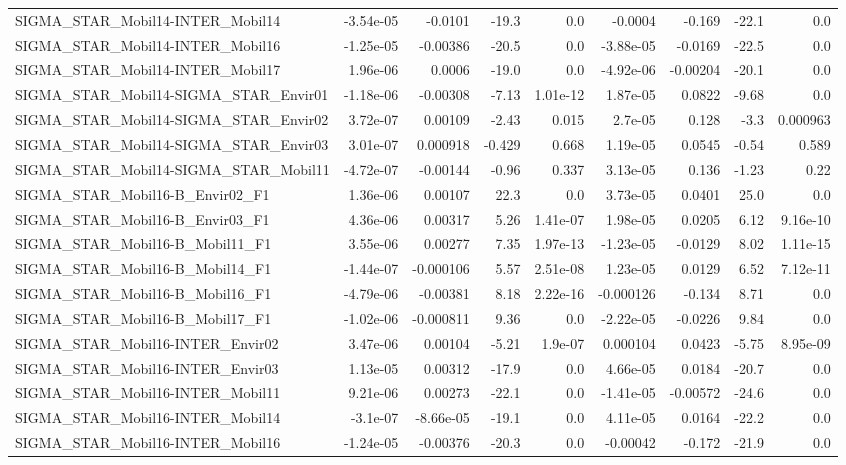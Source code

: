\begin{tabular}{lrrrrrrrr}
SIGMA_STAR_Mobil14-INTER_Mobil14 & -3.54e-05 & -0.0101 & -19.3 & 0.0 & -0.0004 & -0.169 & -22.1 & 0.0 \\
SIGMA_STAR_Mobil14-INTER_Mobil16 & -1.25e-05 & -0.00386 & -20.5 & 0.0 & -3.88e-05 & -0.0169 & -22.5 & 0.0 \\
SIGMA_STAR_Mobil14-INTER_Mobil17 & 1.96e-06 & 0.0006 & -19.0 & 0.0 & -4.92e-06 & -0.00204 & -20.1 & 0.0 \\
SIGMA_STAR_Mobil14-SIGMA_STAR_Envir01 & -1.18e-06 & -0.00308 & -7.13 & 1.01e-12 & 1.87e-05 & 0.0822 & -9.68 & 0.0 \\
SIGMA_STAR_Mobil14-SIGMA_STAR_Envir02 & 3.72e-07 & 0.00109 & -2.43 & 0.015 & 2.7e-05 & 0.128 & -3.3 & 0.000963 \\
SIGMA_STAR_Mobil14-SIGMA_STAR_Envir03 & 3.01e-07 & 0.000918 & -0.429 & 0.668 & 1.19e-05 & 0.0545 & -0.54 & 0.589 \\
SIGMA_STAR_Mobil14-SIGMA_STAR_Mobil11 & -4.72e-07 & -0.00144 & -0.96 & 0.337 & 3.13e-05 & 0.136 & -1.23 & 0.22 \\
SIGMA_STAR_Mobil16-B_Envir02_F1 & 1.36e-06 & 0.00107 & 22.3 & 0.0 & 3.73e-05 & 0.0401 & 25.0 & 0.0 \\
SIGMA_STAR_Mobil16-B_Envir03_F1 & 4.36e-06 & 0.00317 & 5.26 & 1.41e-07 & 1.98e-05 & 0.0205 & 6.12 & 9.16e-10 \\
SIGMA_STAR_Mobil16-B_Mobil11_F1 & 3.55e-06 & 0.00277 & 7.35 & 1.97e-13 & -1.23e-05 & -0.0129 & 8.02 & 1.11e-15 \\
SIGMA_STAR_Mobil16-B_Mobil14_F1 & -1.44e-07 & -0.000106 & 5.57 & 2.51e-08 & 1.23e-05 & 0.0129 & 6.52 & 7.12e-11 \\
SIGMA_STAR_Mobil16-B_Mobil16_F1 & -4.79e-06 & -0.00381 & 8.18 & 2.22e-16 & -0.000126 & -0.134 & 8.71 & 0.0 \\
SIGMA_STAR_Mobil16-B_Mobil17_F1 & -1.02e-06 & -0.000811 & 9.36 & 0.0 & -2.22e-05 & -0.0226 & 9.84 & 0.0 \\
SIGMA_STAR_Mobil16-INTER_Envir02 & 3.47e-06 & 0.00104 & -5.21 & 1.9e-07 & 0.000104 & 0.0423 & -5.75 & 8.95e-09 \\
SIGMA_STAR_Mobil16-INTER_Envir03 & 1.13e-05 & 0.00312 & -17.9 & 0.0 & 4.66e-05 & 0.0184 & -20.7 & 0.0 \\
SIGMA_STAR_Mobil16-INTER_Mobil11 & 9.21e-06 & 0.00273 & -22.1 & 0.0 & -1.41e-05 & -0.00572 & -24.6 & 0.0 \\
SIGMA_STAR_Mobil16-INTER_Mobil14 & -3.1e-07 & -8.66e-05 & -19.1 & 0.0 & 4.11e-05 & 0.0164 & -22.2 & 0.0 \\
SIGMA_STAR_Mobil16-INTER_Mobil16 & -1.24e-05 & -0.00376 & -20.3 & 0.0 & -0.00042 & -0.172 & -21.9 & 0.0 \\

\end{tabular}
